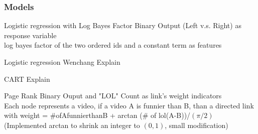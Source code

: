 \documentclass[fleqn]{beamer}
\begin{document}
\begin{frame}
\frametitle{Models}

     \begin{beamerboxesrounded}{Logistic regression with Log Bayes Factor}
         Binary Output (Left v.s. Right) as response variable\\
         log bayes factor of the two ordered ids and a constant term as features
     \end{beamerboxesrounded}

     \begin{beamerboxesrounded}{Logistic regression Wenchang}
         Explain
     \end{beamerboxesrounded}

     \begin{beamerboxesrounded}{CART}
         Explain
      \end{beamerboxesrounded}
     
      \begin{beamerboxesrounded}{Page Rank}
         Binary Ouput and "LOL" Count as link's weight indicators\\
         Each node represents a video, if a video A is funnier than B, than a directed link
         with weight = \#\;of\;A\;funnier\;than\;B + arctan (\# of lol(A-B))/$({\pi}/2)$\\
         (Implemented arctan to shrink an integer to $(0,1)$, small modification)
     \end{beamerboxesrounded}

\end{frame}
\end{document}
